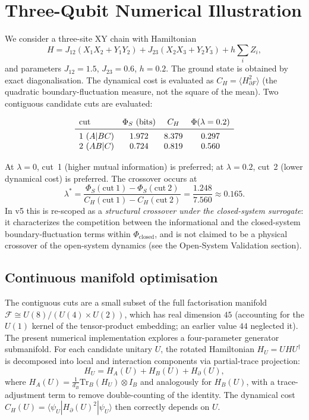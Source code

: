\documentclass[11pt]{article}
\begin{document}
\section{Three-Qubit Numerical Illustration}

We consider a three-site XY chain with Hamiltonian
\[
H = J_{12}(X_1X_2+Y_1Y_2) + J_{23}(X_2X_3+Y_2Y_3) + h\sum_i Z_i,
\]
and parameters $J_{12}=1.5$, $J_{23}=0.6$, $h=0.2$. The ground state is obtained by exact diagonalisation. The dynamical cost is evaluated as $C_H = \langle H_{\partial F}^2\rangle$ (the quadratic boundary-fluctuation measure, not the square of the mean). Two contiguous candidate cuts are evaluated:

\[
\begin{array}{lccc}
\text{cut} & \Phi_S\ (\text{bits}) & C_H & \Phi(\lambda=0.2) \\ \midrule
1\ (A|BC) & 1.972 & 8.379 & 0.297 \\
2\ (AB|C) & 0.724 & 0.819 & 0.560
\end{array}
\]

At $\lambda=0$, cut~1 (higher mutual information) is preferred; at $\lambda=0.2$, cut~2 (lower dynamical cost) is preferred. The crossover occurs at
\[
\lambda^* = \frac{\Phi_S(\text{cut}~1)-\Phi_S(\text{cut}~2)}
{C_H(\text{cut}~1)-C_H(\text{cut}~2)}
= \frac{1.248}{7.560} \approx 0.165.
\]
In v5 this is re-scoped as a \emph{structural crossover under the closed-system surrogate}: it characterizes the competition between the informational and the closed-system boundary-fluctuation terms within $\Phi_{\mathrm{closed}}$, and is not claimed to be a physical crossover of the open-system dynamics (see the Open-System Validation section).

\subsection{Continuous manifold optimisation}
The contiguous cuts are a small subset of the full factorisation manifold $\mathcal F \cong U(8)/(U(4)\times U(2))$, which has real dimension $45$ (accounting for the $U(1)$ kernel of the tensor-product embedding; an earlier value $44$ neglected it). The present numerical implementation explores a four-parameter generator submanifold. For each candidate unitary $U$, the rotated Hamiltonian $H_U = U H U^\dagger$ is decomposed into local and interaction components via partial-trace projection:
\[
H_U = H_A(U) + H_B(U) + H_{\partial}(U),
\]
where $H_A(U) = \frac{1}{d_B}\mathrm{Tr}_B(H_U)\otimes I_B$ and analogously for $H_B(U)$, with a trace-adjustment term to remove double-counting of the identity. The dynamical cost $C_H(U) = \langle \psi_U | H_{\partial}(U)^2 | \psi_U \rangle$ then correctly depends on $U$.
\end{document}

